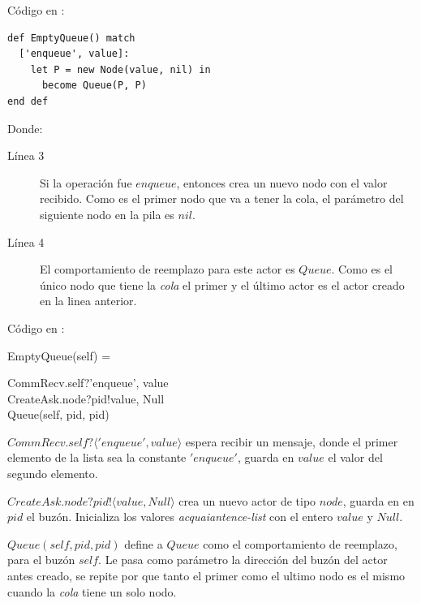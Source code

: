 Código en \SAL:

\begin{lstlisting}[language=sal, style=simple]
def EmptyQueue() match
  ['enqueue', value]:
    let P = new Node(value, nil) in
      become Queue(P, P)
end def
\end{lstlisting}

Donde:

\begin{description}
 \item [Línea 3] Si la operación fue $enqueue$, entonces crea un nuevo nodo con el valor recibido. Como es el primer nodo que va a tener la cola, el parámetro del siguiente nodo en la pila es $nil$.
 \item [Línea 4] El comportamiento de reemplazo para este actor es $Queue$. Como es el único nodo que tiene la \textit{cola} el primer y el último actor es el actor creado en la linea anterior.
\end{description}

Código en \CSP:

\begin{process}
EmptyQueue(self) = \\ \quad
  \begin{block}
  CommRecv.self?\langle 'enqueue', value \rangle \then \\ 
  CreateAsk.node?pid!\langle value, Null\rangle \then \\
  Queue(self, pid, pid)
  \end{block}
\end{process}

\begin{description}
 \item $CommRecv.self?\langle 'enqueue', value \rangle$ espera recibir un mensaje, donde el primer elemento de la lista sea la constante $'enqueue'$, guarda en $value$ el valor del segundo elemento.
 \item $CreateAsk.node?pid!\langle value, Null \rangle$ crea un nuevo actor de tipo $node$, guarda en en $pid$ el buzón. Inicializa los valores \textit{acquaiantence-list} con el entero $value$ y $Null$.
 \item $Queue(self, pid, pid)$ define a $Queue$ como el comportamiento de reemplazo, para el buzón $self$. Le pasa como parámetro la dirección del buzón del actor antes creado, se repite por que tanto el primer como el ultimo nodo es el mismo cuando la \textit{cola} tiene un solo nodo.
\end{description}

